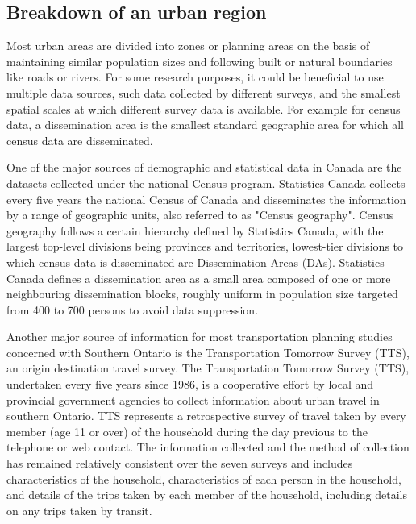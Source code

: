 \subsection{Breakdown of an urban region} \label{subsec:breakdown_of_urban_region}

Most urban areas are divided into zones or planning areas on the basis of maintaining similar population sizes and following built or natural boundaries like roads or rivers.
For some research purposes, it could be beneficial to use multiple data sources, such data collected by different surveys, and the smallest spatial scales at which different survey data is available.
For example for census data, a dissemination area is the smallest standard geographic area for which all census data are disseminated.

One of the major sources of demographic and statistical data in Canada are the datasets collected under the national Census program.
Statistics Canada collects every five years the national Census of Canada and disseminates the information by a range of geographic units, also referred to as "Census geography"\cite{MapandDataLibrary2019}.
Census geography follows a certain hierarchy defined by Statistics Canada, with the largest top-level divisions being provinces and territories, lowest-tier divisions to which census data is disseminated are Dissemination Areas (DAs)\cite{StatisticsCanada2018}.
Statistics Canada defines a dissemination area as a small area composed of one or more neighbouring dissemination blocks, roughly uniform in population size targeted from 400 to 700 persons to avoid data suppression\cite{StatisticsCanada2015}.

Another major source of information for most transportation planning studies concerned with Southern Ontario is the Transportation Tomorrow Survey (TTS)\cite{DataManagementGroup2014}, an origin destination travel survey.
The Transportation Tomorrow Survey (TTS), undertaken every five years since 1986, is a cooperative effort by local and provincial government agencies to collect information about urban travel in southern Ontario.
TTS represents a retrospective survey of travel taken by every member (age 11 or over) of the household during the day previous to the telephone or web contact.
The information collected and the method of collection has remained relatively consistent over the seven surveys and includes characteristics of the household, characteristics of each person in the household, and details of the trips taken by each member of the household, including details on any trips taken by transit\cite{Ashby2018}.

